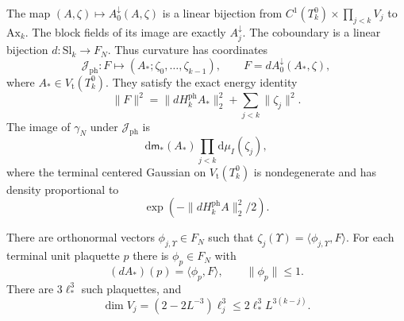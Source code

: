 \documentclass[11pt,letterpaper,reqno]{amsart}
\newcommand{\dd}{\mathrm d}
\begin{document}
\begin{proposition}\label{prop:term-photon-tower}
The map $(A,\zeta)\mapsto A_0^\downarrow(A,\zeta)$
is a linear bijection from
$C^1(T_k^0)\times\prod_{j<k}V_j$ to $\mathrm{Ax}_k$.
The block fields of its image are exactly
$A_j^\downarrow$.
The coboundary is a linear bijection
$d:\mathrm{Sl}_k\to F_N$.
Thus curvature has coordinates
\begin{equation}\label{eq:term-curvature-coordinates}
 \mathcal J_{\mathrm{ph}}:
 F\longmapsto(A_*;\zeta_0,\ldots,\zeta_{k-1}),\qquad
 F=dA_0^\downarrow(A_*,\zeta),
\end{equation}
where $A_*\in V_{\mathrm t}(T_k^0)$.
They satisfy the exact energy identity
\begin{equation}\label{eq:term-tower-energy}
 \|F\|^2=\|dH_k^{\mathrm{ph}}A_*\|_2^2
                                  +\sum_{j<k}\|\zeta_j\|^2 .
\end{equation}
The image of $\gamma_N$ under
$\mathcal J_{\mathrm{ph}}$ is
\begin{equation}\label{eq:term-tower-Gaussian}
                  \dd\mathsf m_*(A_*)\prod_{j<k}\dd\mu_I(\zeta_j),
\end{equation}
where the terminal centered Gaussian on
$V_{\mathrm t}(T_k^0)$ is nondegenerate and has density
proportional to
\[
                  \exp(-\|dH_k^{\mathrm{ph}}A\|_2^2/2).
\]

There are orthonormal vectors
$\phi_{j,\Upsilon}\in F_N$ such that
$\zeta_j(\Upsilon)=\langle\phi_{j,\Upsilon},F\rangle$.
For each terminal unit plaquette $p$ there is
$\phi_p\in F_N$ with
\begin{equation}\label{eq:term-tower-row-norms}
 (dA_*)(p)=\langle\phi_p,F\rangle,\qquad \|\phi_p\|\le1.
\end{equation}
There are $3\ell_*^3$ such plaquettes, and
\begin{equation}\label{eq:term-tower-coordinate-count}
 \dim V_j=(2-2L^{-3})\ell_j^3
                       \le2\ell_*^3L^{3(k-j)} .
\end{equation}
\end{proposition}
\end{document}
